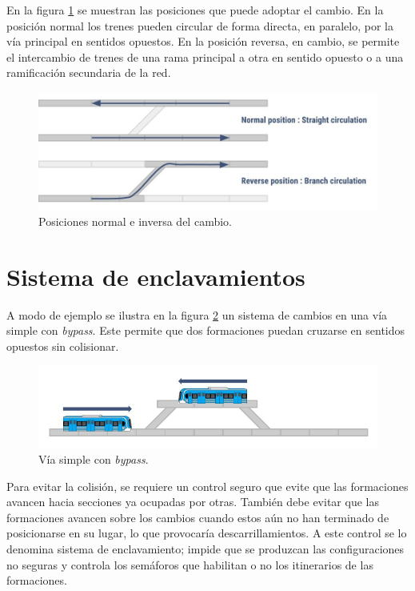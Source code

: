 			En la figura \ref{fig:Cambios} se muestran las posiciones que puede adoptar el cambio. En la posición normal los trenes pueden circular de forma directa, en paralelo, por la vía principal en sentidos opuestos. En la posición reversa, en cambio, se permite el intercambio de trenes de una rama principal a otra en sentido opuesto o a una ramificación secundaria de la red.
			
			\begin{figure}[h!]
				\centering
				\includegraphics[scale=.45]{./Figures/Cambios}
				\caption{Posiciones normal e inversa del cambio.}
				\label{fig:Cambios}
			\end{figure} 	
					
	\section{Sistema de enclavamientos}

		A modo de ejemplo se ilustra en la figura \ref{fig:Bypass} un sistema de cambios en una vía simple con \emph{bypass}. Este permite que dos formaciones puedan cruzarse en sentidos opuestos sin colisionar.
	
		\begin{figure}[h!]
			\centering
			\includegraphics[scale=.45]{./Figures/Bypass_2}
			\caption{Vía simple con \textit{bypass}.}
			\label{fig:Bypass}
		\end{figure}
			
		Para evitar la colisión, se requiere un control seguro que evite que las formaciones avancen hacia secciones ya ocupadas por otras. También debe evitar que las formaciones avancen sobre los cambios cuando estos aún no han terminado de posicionarse en su lugar, lo que provocaría descarrillamientos. A este control se lo denomina sistema de enclavamiento; impide que se produzcan las configuraciones no seguras y controla los semáforos que habilitan o no los itinerarios de las formaciones.		
					 
